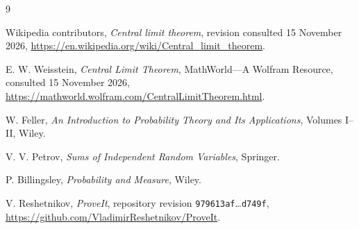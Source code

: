 \documentclass[11pt]{article}
\newcommand{\code}[1]{\nolinkurl{#1}}
\begin{document}
\begin{thebibliography}{9}

Wikipedia contributors,
\emph{Central limit theorem}, revision consulted 15 November 2026,
\url{https://en.wikipedia.org/wiki/Central_limit_theorem}.

E. W. Weisstein,
\emph{Central Limit Theorem}, MathWorld---A Wolfram Resource,
consulted 15 November 2026,
\url{https://mathworld.wolfram.com/CentralLimitTheorem.html}.

W. Feller,
\emph{An Introduction to Probability Theory and Its Applications},
Volumes I--II, Wiley.

V. V. Petrov,
\emph{Sums of Independent Random Variables}, Springer.

P. Billingsley,
\emph{Probability and Measure}, Wiley.

V. Reshetnikov,
\emph{ProveIt}, repository revision \code{979613af}\allowbreak\ldots\code{d749f},
\url{https://github.com/VladimirReshetnikov/ProveIt}.

\end{thebibliography}
\end{document}
